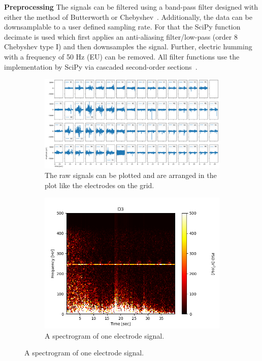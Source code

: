 \documentclass[11pt, twocolumn]{article}
\begin{document}
		\textbf{Preprocessing}
            The signals can be filtered using a band-pass filter designed with either the method of Butterworth or Chebyshev~\autocite{williams2006electronic}.
            Additionally, the data can be downsamplable to a user defined sampling rate.
            For that the SciPy function decimate is used which first applies an anti-aliasing filter/low-pass (order 8 Chebyshev type I) and then downsamples the signal.
            Further, electric humming with a frequency of 50 Hz (EU) can be removed.
            All filter functions use the implementation by SciPy via cascaded second-order sections~\autocite{2020SciPy-NMeth}.

			\begin{figure}
			\begin{subfigure}{0.45\textwidth}
			\begin{center}
			\includegraphics[keepaspectratio, width=\linewidth]{img/4_raw.png}
			\end{center}
			\caption{The raw signals can be plotted and are arranged in the plot like the electrodes on the grid.}
			\end{subfigure}

			\begin{subfigure}{0.45\textwidth}
			\begin{center}
			\includegraphics[keepaspectratio, width=\linewidth]{img/4_spectrogram.png}
			\end{center}
			\caption{A spectrogram of one electrode signal.}
			\end{subfigure}


\end{figure}
\end{document}
